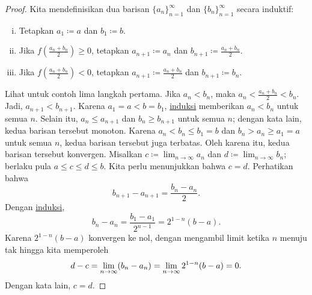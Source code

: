 \begin{proof}
Kita mendefinisikan dua barisan $\{ a_n \}_{n=1}^\infty$
dan $\{ b_n \}_{n=1}^\infty$ secara induktif:
\begin{enumerate}[(i)]
\item Tetapkan $a_1 \coloneqq a$ dan $b_1 \coloneqq b$.
\item Jika $f\left(\frac{a_n+b_n}{2}\right) \geq 0$, tetapkan $a_{n+1} \coloneqq a_n$ dan
$b_{n+1} \coloneqq \frac{a_n+b_n}{2}$.
\item Jika $f\left(\frac{a_n+b_n}{2}\right) < 0$, tetapkan $a_{n+1} \coloneqq \frac{a_n+b_n}{2}$ dan
$b_{n+1} \coloneqq b_n$.
\end{enumerate}
\begin{myfigureht}
\caption{Menentukan akar (metode biseksi).\label{bisectfig}}
\end{myfigureht}
Lihat  untuk contoh lima langkah pertama.
Jika $a_n < b_n$, maka $a_n < \frac{a_n+b_n}{2} < b_n$.  Jadi,
$a_{n+1} < b_{n+1}$.
Karena $a_1 = a < b = b_1$,
\hyperref[induction:thm]{induksi} memberikan
$a_n < b_n$ untuk semua $n$.
Selain itu, $a_n \leq a_{n+1}$ dan
$b_n \geq b_{n+1}$ untuk semua $n$; dengan kata lain, kedua barisan tersebut monoton.
Karena $a_n < b_n \leq b_1 = b$ dan
$b_n > a_n \geq a_1 = a$ untuk semua $n$,
kedua barisan tersebut juga terbatas.  Oleh karena itu,
kedua barisan tersebut konvergen.
Misalkan $c \coloneqq \lim_{n\to\infty} a_n$ dan $d \coloneqq \lim_{n\to\infty} b_n$;
berlaku pula $a \leq c \leq d \leq b$.  Kita perlu
menunjukkan bahwa $c=d$.
Perhatikan bahwa
\begin{equation*}
b_{n+1} - a_{n+1} = \frac{b_n-a_n}{2}.
\end{equation*}
Dengan \hyperref[induction:thm]{induksi},
\begin{equation*}
b_n - a_n = \frac{b_1-a_1}{2^{n-1}} = 2^{1-n} (b-a) .
\end{equation*}
Karena $2^{1-n}(b-a)$ konvergen ke nol, dengan mengambil limit ketika $n$ menuju
tak hingga kita memperoleh
\begin{equation*}
d-c = \lim_{n\to\infty} (b_n - a_n) =
\lim_{n\to\infty} 2^{1-n} (b-a) = 0.
\avoidbreak
\end{equation*}
Dengan kata lain, $c=d$.


\end{proof}
